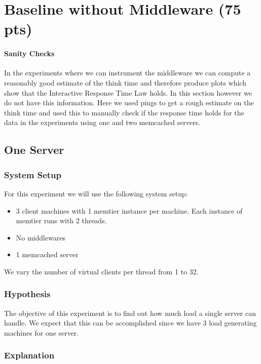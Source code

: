 \documentclass[11pt,a4paper]{article}
\begin{document}
\section{Baseline without Middleware (75 pts)}
%
\paragraph{Sanity Checks}
%
In the experiments where we can instrument the middleware we can compute a reasonably good estimate of the think time and therefore produce plots which show that the Interactive Response Time Law holds.
%
In this section however we do not have this information.
%
Here we used pings to get a rough estimate on the think time and used this to manually check if the response time holds for the data in the experiments using one and two memcached servers.
%
\subsection{One Server}
%
\subsubsection{System Setup}
%
For this experiment we will use the following system setup:
%
\begin{itemize}
	\item 3 client machines with 1 memtier instance per machine. Each instance of memtier runs with 2 threads.
	\item No middlewares
	\item 1 memcached server
\end{itemize}
%
We vary the number of virtual clients per thread from 1 to 32.
%
\subsubsection{Hypothesis}
%
The objective of this experiment is to find out how much load a single server can handle.
%
We expect that this can be accomplished since we have 3 load generating machines for one server.
%
\subsubsection{Explanation}\label{sec:one_server_explanantion}
%
\end{document}
